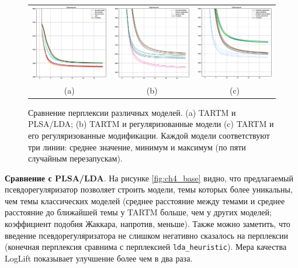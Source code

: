 \begin{figure}
\setlength\tabcolsep{0pt} %
\begin{tabular}{ccc}
    \includegraphics[width=54mm]{images/CH4_baselines_PerplexityScore.eps} &   \includegraphics[width=54mm]{images/CH4_vs_regularized_PerplexityScore.eps} & \includegraphics[width=54mm]{images/CH4_improved_PerplexityScore.eps} \\
    (a)  & (b) & (c) \\[6pt]
\end{tabular}
    \caption{Сравнение перплексии различных моделей. (a) TARTM и PLSA/LDA; (b) TARTM и регуляризованные модели (c) TARTM и его регуляризованные модификации. Каждой модели соответствуют три линии: среднее значение, минимум и максимум (по пяти случайным перезапускам).}
\label{fig:Perple3x}
\end{figure}

\textbf{Сравнение с PLSA/LDA}. На рисунке \ref{fig:ch4_base} видно, что предлагаемый псевдорегуляризатор позволяет строить модели, темы которых более уникальны, чем темы классических моделей (среднее расстояние между темами и среднее расстояние до ближайшей темы у TARTM больше, чем у других моделей; коэффициент подобия Жаккара, напротив, меньше). Также можно заметить, что введение псевдорегуляризатора не слишком негативно сказалось на перплексии (конечная перплексия сравнима с перплексией \texttt{lda\_heuristic}). Мера качества LogLift показывает улучшение более чем в два раза.

